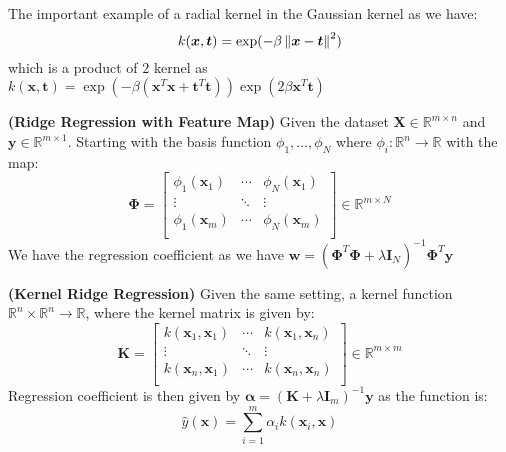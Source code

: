 \begin{remark}
    The important example of a radial kernel in the Gaussian kernel as we have:
    \begin{equation*}
        k(\boldsymbol x, \boldsymbol t) = \exp(-\beta\left\lVert\boldsymbol x- \boldsymbol t\right\rVert^2)
    \end{equation*}
    which is a product of $2$ kernel as $k(\boldsymbol x, \boldsymbol t) = \exp(-\beta(\boldsymbol x^T\boldsymbol x + \boldsymbol t^T\boldsymbol t))\exp(2\beta\boldsymbol x^T\boldsymbol t)$
\end{remark}

\begin{remark}{\textbf{(Ridge Regression with Feature Map)}}
    Given the dataset $\boldsymbol X \in \mathbb{R}^{m\times n}$  and $\boldsymbol y \in \mathbb{R}^{m\times 1}$. Starting with the basis function $\phi_1,\dots,\phi_N$ where $\phi_i : \mathbb{R}^n \rightarrow \mathbb{R}$ with the map:
    \begin{equation*}
        \boldsymbol \Phi = \begin{bmatrix}
            \phi_1(\boldsymbol x_1) & \cdots & \phi_N(\boldsymbol x_1)  \\
            \vdots & \ddots & \vdots \\
            \phi_1(\boldsymbol x_m) & \cdots & \phi_N(\boldsymbol x_m)  \\
        \end{bmatrix} \in \mathbb{R}^{m\times N}
    \end{equation*}
    We have the regression coefficient as we have $\boldsymbol w = (\boldsymbol \Phi^T\boldsymbol \Phi + \lambda \boldsymbol I_N)^{-1}\boldsymbol \Phi^T\boldsymbol y$
\end{remark}

\begin{remark}{\textbf{(Kernel Ridge Regression)}}
    Given the same setting, a kernel function $\mathbb{R}^n\times \mathbb{R}^n \rightarrow \mathbb{R}$, where the kernel matrix is given by:
    \begin{equation*}
        \boldsymbol K = \begin{bmatrix}
            k(\boldsymbol x_1,\boldsymbol x_1) & \cdots & k(\boldsymbol x_1, \boldsymbol x_n) \\
            \vdots & \ddots & \vdots \\
            k(\boldsymbol x_n,\boldsymbol x_1) & \cdots & k(\boldsymbol x_n, \boldsymbol x_n) \\
        \end{bmatrix} \in \mathbb{R}^{m\times m}
    \end{equation*}
    Regression coefficient is then given by $\boldsymbol \alpha = (\boldsymbol K + \lambda \boldsymbol I_m)^{-1}\boldsymbol y$ as the function is:
    \begin{equation*}
        \hat{y}(\boldsymbol x) = \sum^m_{i=1}\alpha_i k(\boldsymbol x_i, \boldsymbol x)
    \end{equation*}
\end{remark}
